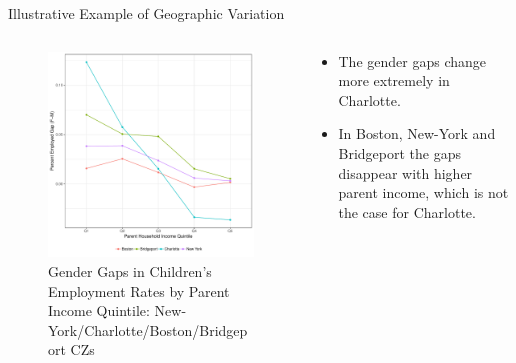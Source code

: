 \documentclass{beamer}
\begin{document}
\begin{frame}{Illustrative Example of Geographic Variation}
\begin{columns}
	
	\begin{column}{0.52\textwidth}
		\vspace{\topsep}
		\begin{figure}
			\vspace{-0.5cm}	
			\includegraphics[width=\columnwidth]{../fig_ys.pdf}
			\caption{{\scriptsize Gender Gaps in Children’s Employment Rates by Parent Income Quintile:
					New-York/Charlotte/Boston/Bridgeport CZs}}
		\end{figure}	
	\end{column}
	
	\begin{column}{0.4\textwidth}
		\vspace{-2.5cm}	
		\begin{itemize}
			\item The gender gaps change more extremely in Charlotte. 
			\item In Boston, New-York and Bridgeport the gaps disappear with higher parent income, which is not the case for Charlotte.
		\end{itemize}
	\end{column}
	
\end{columns}
\end{frame}
\end{document}
